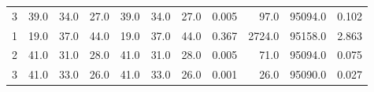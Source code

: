 \begin{tabular}{lrrrrrrrrrr}
3 &                39.0 &                34.0 &                 27.0 &          39.0 &            34.0 &             27.0 &                                         0.005 &                     97.0 &                     95094.0 &                         0.102 \\
1 &                19.0 &                37.0 &                 44.0 &          19.0 &            37.0 &             44.0 &                                         0.367 &                   2724.0 &                     95158.0 &                         2.863 \\
2 &                41.0 &                31.0 &                 28.0 &          41.0 &            31.0 &             28.0 &                                         0.005 &                     71.0 &                     95094.0 &                         0.075 \\
3 &                41.0 &                33.0 &                 26.0 &          41.0 &            33.0 &             26.0 &                                         0.001 &                     26.0 &                     95090.0 &                         0.027 \\
\bottomrule
\end{tabular}
